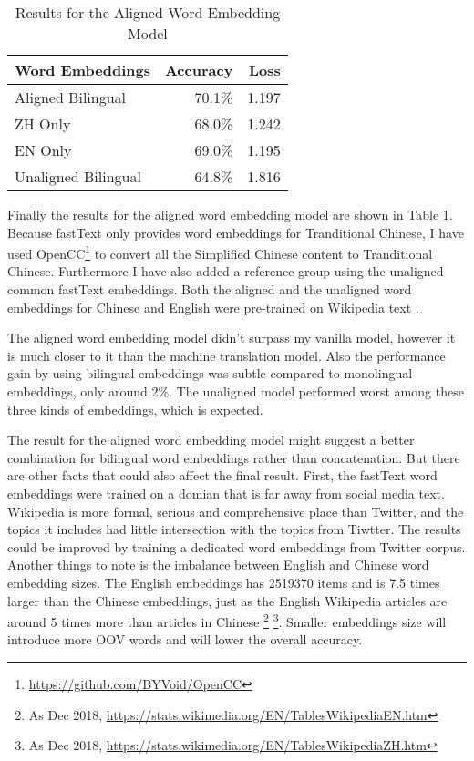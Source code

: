 \documentclass[11pt,a4paper]{article}
\begin{document}
\begin{table}[t]
  \begin{center}
  \begin{tabular}{|l|r|r|}
  \hline \bf Word Embeddings & \bf Accuracy & \bf Loss \\ \hline
  Aligned Bilingual & 70.1\% & 1.197 \\
  \hspace{0.5cm} ZH Only & 68.0\% & 1.242 \\
  \hspace{0.5cm} EN Only & 69.0\% & 1.195 \\
  Unaligned Bilingual & 64.8\% & 1.816 \\
  \hline
  \end{tabular}
  \end{center}
  \caption{\label{tab:cnn-results-table} Results for the Aligned Word Embedding Model}
\end{table}

Finally the results for the aligned word embedding model are shown in Table \ref{tab:cnn-results-table}. Because fastText only provides word embeddings for Tranditional Chinese, I have used OpenCC\footnote{\url{https://github.com/BYVoid/OpenCC}} to convert all the Simplified Chinese content to Tranditional Chinese. Furthermore I have also added a reference group using the unaligned common fastText embeddings. Both the aligned and the unaligned word embeddings for Chinese and English were pre-trained on Wikipedia text \cite{bojanowski2017enriching}.

The aligned word embedding model didn't surpass my vanilla model, however it is much closer to it than the machine translation model. Also the performance gain by using bilingual embeddings was subtle compared to monolingual embeddings, only around 2\%. The unaligned model performed worst among these three kinds of embeddings, which is expected.

The result for the aligned word embedding model might suggest a better combination for bilingual word embeddings rather than concatenation. But there are other facts that could also affect the final result. First, the fastText word embeddings were trained on a domian that is far away from social media text. Wikipedia is more formal, serious and comprehensive place than Twitter, and the topics it includes had little intersection with the topics from Tiwtter. The results could be improved by training a dedicated word embeddings from Twitter corpus. Another things to note is the imbalance between English and Chinese word embedding sizes. The English embeddings has 2519370 items and is 7.5 times larger than the Chinese embeddings, just as the English Wikipedia articles are around 5 times more than articles in Chinese \footnote{As Dec 2018, \url{https://stats.wikimedia.org/EN/TablesWikipediaEN.htm}} \footnote{As Dec 2018, \url{https://stats.wikimedia.org/EN/TablesWikipediaZH.htm}}. Smaller embeddings size will introduce more OOV words and will lower the overall accuracy.
\end{document}
